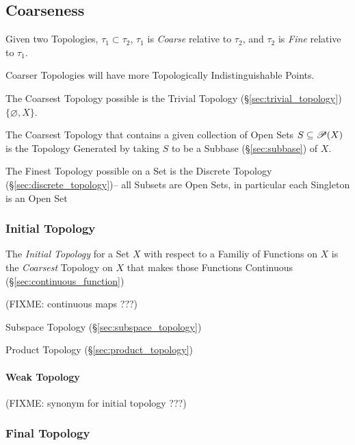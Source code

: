 \subsection{Coarseness}\label{sec:coarseness}

Given two Topologies, $\tau_1 \subset \tau_2$, $\tau_1$ is
\emph{Coarse} relative to $\tau_2$, and $\tau_2$ is \emph{Fine}
relative to $\tau_1$.

Coarser Topologies will have more Topologically Indistinguishable
Points.

The Coarsest Topology possible is the Trivial Topology
(\S\ref{sec:trivial_topology}) $\{ \varnothing, X \}$.

The Coarsest Topology that contains a given collection of Open Sets $S
\subseteq \mathscr{P}(X)$ is the Topology Generated by taking $S$ to
be a Subbase (\S\ref{sec:subbase}) of $X$.

The Finest Topology possible on a Set is the Discrete Topology
(\S\ref{sec:discrete_topology})-- all Subsets are Open Sets, in particular each
Singleton is an Open Set



\subsubsection{Initial Topology}\label{sec:initial_topology}

The \emph{Initial Topology} for a Set $X$ with respect to a Familiy of
Functions on $X$ is the \emph{Coarsest} Topology on $X$ that makes those
Functions Continuous (\S\ref{sec:continuous_function})

(FIXME: continuous maps ???)

Subspace Topology (\S\ref{sec:subspace_topology})

Product Topology (\S\ref{sec:product_topology})



\paragraph{Weak Topology}\label{sec:weak_topology}

(FIXME: synonym for initial topology ???)



\subsubsection{Final Topology}\label{sec:final_topology}


